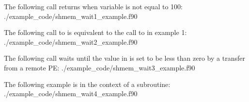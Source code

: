 \begin{apidefinition}
\begin{apiexamples}
\apifexample
{ The following call returns when variable  is not equal to 100:}
{./example_code/shmem_wait1_example.f90}
{}

\apifexample
{ The following call to  is  equivalent to the
call to  in example 1:}
{./example_code/shmem_wait2_example.f90}
{}

\apicexample
{The following \CorCpp{} call waits until the value in  is set to
be less than zero by a transfer from a remote PE:}
{./example_code/shmem_wait3_example.f90}
{}

\apifexample
{The following \Fortran{} example is in the context of a subroutine:}
{./example_code/shmem_wait4_example.f90}
{}

\end{apiexamples}

\end{apidefinition}
